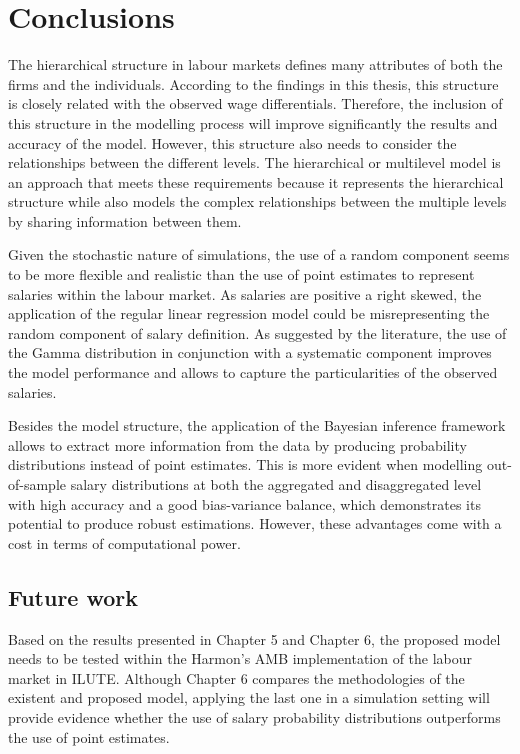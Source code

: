 \chapter{Conclusions}

The hierarchical structure in labour markets defines many attributes of both the firms and the individuals. According to the findings in this thesis, this structure is closely related with the observed wage differentials. Therefore, the inclusion of this structure in the modelling process will improve significantly the results and accuracy of the model. However, this structure also needs to consider the relationships between the different levels. The hierarchical or multilevel model is an approach that meets these requirements because it represents the hierarchical structure while also models the complex relationships between the multiple levels by sharing information between them. 

Given the stochastic nature of simulations, the use of a random component seems to be more flexible and realistic than the use of point estimates to represent salaries within the labour market. As salaries are positive a right skewed, the application of the regular linear regression model could be misrepresenting the random component of salary definition. As suggested by the literature, the use of the Gamma distribution in conjunction with a systematic component improves the model performance and allows to capture the particularities of the observed salaries. 

Besides the model structure, the application of the Bayesian inference framework allows to extract more information from the data by producing probability distributions instead of point estimates. This is more evident when modelling out-of-sample salary distributions at both the aggregated and disaggregated level with high accuracy and a good bias-variance balance, which demonstrates its potential to produce robust estimations. However, these advantages come with a cost in terms of computational power. 

\section{Future work}

Based on the results presented in Chapter 5 and Chapter 6, the proposed model needs to be tested within the Harmon's AMB implementation of the labour market in ILUTE. Although Chapter 6 compares the methodologies of the existent and proposed model, applying the last one in a simulation setting will provide evidence whether the use of salary probability distributions outperforms the use of point estimates. 

